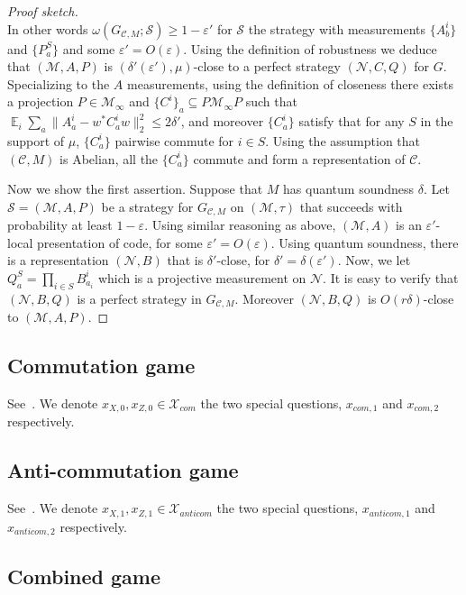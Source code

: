 \documentclass[11pt]{article}
\theoremstyle{definition}
\newcommand{\code}{\mathcal{C}}
\newcommand{\strategy}{\mathscr{S}}
\DeclareMathOperator*{\Expectation}{\mathbb{E}}
\newcommand{\Es}[1]{\Expectation_{#1}}
\newcommand{\mM}{\ensuremath{\mathcal{M}}}
\newcommand{\mX}{\ensuremath{\mathcal{X}}}
\newcommand{\eps}{\varepsilon}
\newcommand{\mN}{\mathcal{N}}
\begin{document}
\begin{proof}[Proof sketch]
\begin{equation}
\end{equation}
In other words $\omega(G_{\code,M};\strategy)\geq 1-\eps'$ for $\strategy$ the strategy with measurements $\{A^i_b\}$ and $\{P^{S}_a\}$ and some $\eps'=O(\eps)$. Using the definition of robustness we deduce that $(\mM,A,P)$ is $(\delta'(\eps'),\mu)$-close to a perfect strategy $(\mN,C,Q)$ for $G$. Specializing to the $A$ measurements, using the definition of closeness there exists a projection $P\in \mM_\infty$ and $\{C^i\}_a \subseteq P\mM_\infty P$ such that $\Es{i}\sum_a \|A^i_a-w^* C^i_a w \|_2^2 \leq 2\delta'$, and moreover $\{C^i_a\}$ satisfy that for any $S$ in the support of $\mu$, $\{C^i_a\}$ pairwise commute for $i\in S$. Using the assumption that $(\code,M)$ is Abelian, all the $\{C^i_a\}$ commute and form a representation of $\code$.

Now we show the first assertion. Suppose that $M$ has quantum soundness $\delta$.
Let $\strategy=(\mM,A,P)$ be a strategy for $G_{\code,M}$ on $(\mM,\tau)$ that succeeds with probability at least $1-\eps$. Using similar reasoning as above, $(\mM,A)$ is an $\eps'$-local presentation of code, for some $\eps'=O(\eps)$. Using quantum soundness, there is a representation $(\mN,B)$ that is $\delta'$-close, for $\delta'=\delta(\eps')$. Now, we let $Q^S_a = \prod_{i\in S} B^i_{a_i}$ which is a projective measurement on $\mN$. It is easy to verify that $(\mN,B,Q)$ is a perfect strategy in $G_{\code,M}$. Moreover $(\mN,B,Q)$ is $O(r\delta)$-close to $(\mM,A,P)$.
\end{proof}


\subsection{Commutation game}

See~\cite[Section 3.1]{de2022spectral}. We denote $x_{X,0}, x_{Z,0} \in \mX_{com}$ the two special questions, $x_{com,1}$ and $x_{com,2}$ respectively. 

\subsection{Anti-commutation game}

See~\cite[Section 3.2]{de2022spectral}. We denote $x_{X,1}, x_{Z,1} \in \mX_{anticom}$ the two special questions, $x_{anticom,1}$ and $x_{anticom,2}$ respectively. 

\subsection{Combined game}
\end{document}
